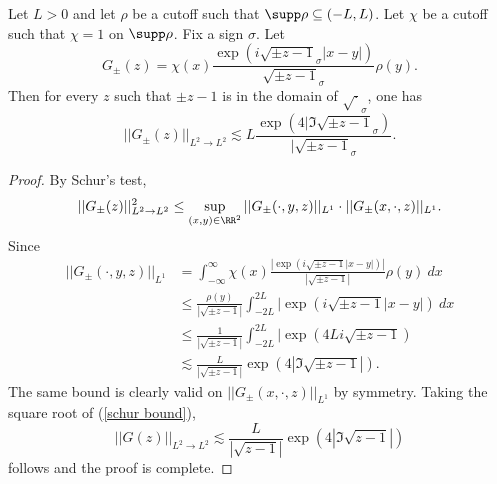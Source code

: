 \begin{lemma}
\label{bounds on partial resolvent}
Let $L > 0$ and let $\rho$ be a cutoff such that $\supp \rho \subseteq (-L, L)$.
Let $\chi$ be a cutoff such that $\chi = 1$ on $\supp \rho$.
Fix a sign $\sigma$.
Let
$$G_\pm(z) = \chi(x) \frac{\exp(i\sqrt{\pm z - 1}_\sigma|x-y|)}{\sqrt{\pm z - 1}_\sigma} \rho(y).$$
Then for every $z$ such that $\pm z - 1$ is in the domain of $\sqrt\cdot_\sigma$, one has
$$||G_\pm(z)||_{L^2 \to L^2} \lesssim L\frac{\exp(4|\Im \sqrt{\pm z - 1}_\sigma)}{|\sqrt{\pm z - 1}_\sigma}.$$
\end{lemma}
\begin{proof}
By Schur's test,
\begin{equation}
\label{schur bound}
||G_\pm(z)||_{L^2 \to L^2}^2 \leq \sup_{(x, y) \in \RR^2} ||G_\pm (\cdot, y, z)||_{L^1}\cdot||G_\pm (x, \cdot, z)||_{L^1}.
\end{equation}
Since
\begin{align*}
||G_\pm (\cdot, y, z)||_{L^1} &= \int_{-\infty}^\infty \chi(x) \frac{|\exp(i\sqrt{\pm z-1}|x-y|)|}{|\sqrt{\pm z-1}|}\rho(y)~dx\\
&\leq \frac{\rho(y)}{|\sqrt{\pm z-1}|} \int_{-2L}^{2L} |\exp(i\sqrt{\pm z-1}|x-y|)~dx\\
&\leq \frac{1}{|\sqrt{\pm z-1}|} \int_{-2L}^{2L} |\exp(4Li\sqrt{\pm z-1})\\
&\lesssim \frac{L}{|\sqrt{\pm z-1}|} \exp(4 |\Im\sqrt{\pm z-1}|).
\end{align*}
The same bound is clearly valid on $||G_\pm(x, \cdot, z)||_{L^1}$ by symmetry. Taking the square root of (\ref{schur bound}),
$$||G(z)||_{L^2 \to L^2} \lesssim \frac{L}{|\sqrt{z-1}|} \exp(4 |\Im\sqrt{z-1}|)$$
follows and the proof is complete.
\end{proof}

